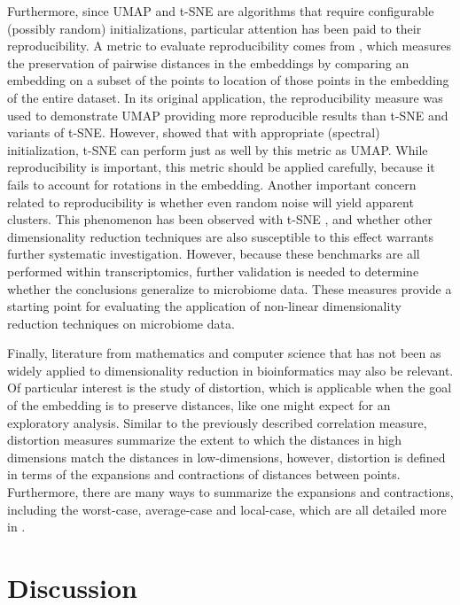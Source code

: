 Furthermore, since UMAP and t-SNE are algorithms that require configurable (possibly random) initializations, particular attention has been paid to their reproducibility. A metric to evaluate reproducibility comes from \cite{Becht2019-hm}, which measures the preservation of pairwise distances in the embeddings by comparing an embedding on a subset of the points to location of those points in the embedding of the entire dataset. In its original application, the reproducibility measure was used to demonstrate UMAP providing more reproducible results than t-SNE and variants of t-SNE. However, \cite{Kobak2021-ih} showed that with appropriate (spectral) initialization, t-SNE can perform just as well by this metric as UMAP. While reproducibility is important, this metric should be applied carefully, because it fails to account for rotations in the embedding. Another important concern related to reproducibility is whether even random noise will yield apparent clusters. This phenomenon has been observed with t-SNE \cite{Wattenberg2016-oh}, and whether other dimensionality reduction techniques are also susceptible to this effect warrants further systematic investigation. However, because these benchmarks are all performed within transcriptomics, further validation is needed to determine whether the conclusions generalize to microbiome data.  These measures provide a starting point for evaluating the application of non-linear dimensionality reduction techniques on microbiome data.

Finally, literature from mathematics and computer science that has not been as widely applied to dimensionality reduction in bioinformatics may also be relevant. Of particular interest is the study of distortion, which is applicable when the goal of the embedding is to preserve distances, like one might expect for an exploratory analysis. Similar to the previously described correlation measure, distortion measures summarize the extent to which the distances in high dimensions match the distances in low-dimensions, however, distortion is defined in terms of the expansions and contractions of distances between points. Furthermore, there are many ways to summarize the expansions and contractions, including the worst-case, average-case and local-case, which are all detailed more in \cite{Vankadara2018-sm}. 

\section{Discussion}

